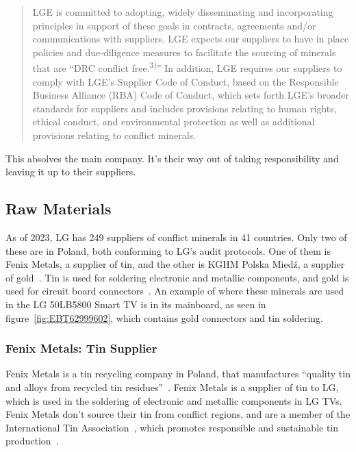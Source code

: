 \documentclass[12pt, letterpaper]{article}
\begin{document}
\begin{quote}
  LGE is committed to adopting, widely disseminating and incorporating
  principles in support of these goals in contracts, agreements and/or
  communications with suppliers. LGE expects our suppliers to have in
  place policies and due-diligence measures to facilitate the sourcing
of minerals that are ``DRC conflict free.\textsuperscript{3)}'' In
addition, LGE requires
our suppliers to comply with LGE's Supplier Code of Conduct, based on
the Responsible Business Alliance (RBA) Code of Conduct, which sets
forth LGE's broader standards for suppliers and includes provisions
relating to human rights, ethical conduct, and environmental
protection as well as additional provisions relating to conflict minerals.
\end{quote}

This absolves the main company. It's their way out of taking
responsibility and leaving it up to their suppliers.

\subsection{Raw Materials}

As of 2023, LG has 249 suppliers of conflict minerals in 41
countries. Only two of these are in Poland, both conforming to LG's
audit protocols. One of them is Fenix Metals, a supplier of tin, and
the other is KGHM Polska Mied\'z, a supplier of
gold~\autocite{lg-electronics-2023}. Tin is used for soldering
electronic and metallic components, and gold is used for circuit
board connectors~\autocite{brigham-2023}. An example of where these
minerals are used in the LG 50LB5800 Smart TV is in its mainboard, as
seen in figure~\ref{fig:EBT62999602}, which contains gold connectors
and tin soldering.

\subsubsection{Fenix Metals: Tin Supplier}

Fenix Metals is a tin recycling company in Poland, that manufactures
``quality tin and alloys from recycled tin
residues''~\autocite{fenix-metals-no-dateB}. Fenix Metals is a
supplier of tin to LG, which is used in the soldering of electronic
and metallic components in LG TVs. Fenix Metals don't source their
tin from conflict regions, and are a member of the International Tin
Association~\autocite{international-tin-association-2022}, which
promotes responsible and sustainable tin
production~\autocite{international-tin-association-2024}.
\end{document}
